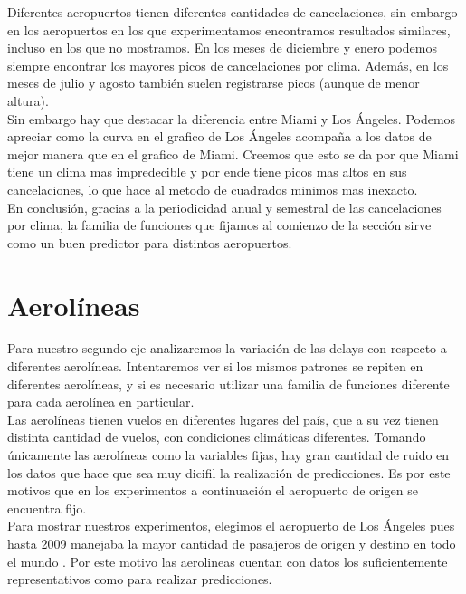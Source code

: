 Diferentes aeropuertos tienen diferentes cantidades de cancelaciones, sin embargo en los aeropuertos en los que experimentamos encontramos resultados similares, incluso en los que no mostramos. En los meses de diciembre y enero podemos siempre encontrar los mayores picos de cancelaciones por clima. Además, en los meses de julio y agosto también suelen registrarse picos (aunque de menor altura). \\

Sin embargo hay que destacar la diferencia entre Miami y Los Ángeles. Podemos apreciar como la curva en el grafico de Los Ángeles acompaña a los datos de mejor manera que en el grafico de Miami. Creemos que esto se da por que Miami tiene un clima mas impredecible y por ende tiene picos mas altos en sus cancelaciones, lo que hace al metodo de cuadrados minimos mas inexacto.\\

En conclusión, gracias a la periodicidad anual y semestral de las cancelaciones por clima, la familia de funciones que fijamos al comienzo de la sección sirve como un buen predictor para distintos aeropuertos. \\

\section{Aerolíneas}

Para nuestro segundo eje analizaremos la variación de las delays con respecto a diferentes aerolíneas. Intentaremos ver si los mismos patrones se repiten en diferentes aerolíneas, y si es necesario utilizar una familia de funciones diferente para cada aerolínea en particular. \\

Las aerolíneas tienen vuelos en diferentes lugares del país, que a su vez tienen distinta cantidad de vuelos, con condiciones climáticas diferentes. Tomando únicamente las aerolíneas como la variables fijas, hay gran cantidad de ruido en los datos que hace que sea muy dicifil la realización de predicciones. Es por este motivos que en los experimentos a continuación el aeropuerto de origen se encuentra fijo. \\

Para mostrar nuestros experimentos, elegimos el aeropuerto de Los Ángeles pues hasta 2009 manejaba la mayor cantidad de pasajeros de origen y destino en todo el mundo \cite{LosAngelesAeropuerto}. Por este motivo las aerolineas cuentan con datos los suficientemente representativos como para realizar predicciones. \\

